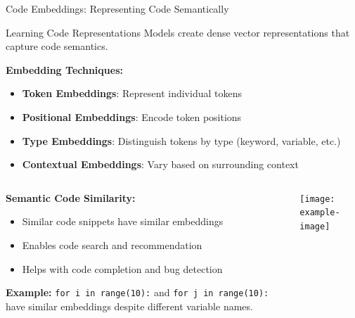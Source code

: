 \documentclass{beamer}
\begin{document}
\begin{frame}[t]{Code Embeddings: Representing Code Semantically}
    \begin{block}{Learning Code Representations}
        Models create dense vector representations that capture code semantics.
    \end{block}
    
    \textbf{Embedding Techniques:}
    \begin{itemize}
        \item \textbf{Token Embeddings}: Represent individual tokens
        \item \textbf{Positional Embeddings}: Encode token positions
        \item \textbf{Type Embeddings}: Distinguish tokens by type (keyword, variable, etc.)
        \item \textbf{Contextual Embeddings}: Vary based on surrounding context
    \end{itemize}
    
    \begin{columns}[t]
        \begin{column}{0.6\textwidth}
            \textbf{Semantic Code Similarity:}
            \begin{itemize}
                \item Similar code snippets have similar embeddings
                \item Enables code search and recommendation
                \item Helps with code completion and bug detection
            \end{itemize}
            
            \textbf{Example:}
            \texttt{for i in range(10):} and \texttt{for j in range(10):} have similar embeddings despite different variable names.
        \end{column}
        \begin{column}{0.4\textwidth}
            \centering
            \texttt{[image: example-image]} %
        \end{column}
    \end{columns}
\end{frame}
\end{document}
